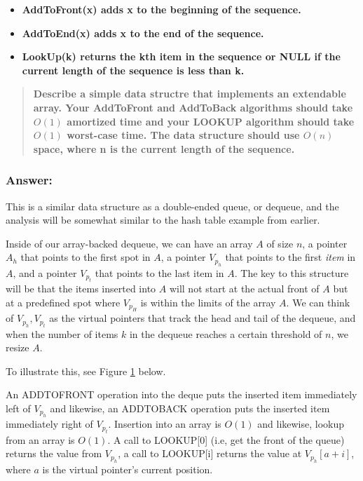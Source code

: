 \documentclass[titlepage]{article}\usepackage[]{graphicx}\usepackage[]{color}
\begin{document}
\begin{itemize}
  \item \textbf{AddToFront(x) adds x to the beginning of the sequence.}
  \item \textbf{AddToEnd(x) adds x to the end of the sequence.}
  \item \textbf{LookUp(k) returns the kth item in the sequence or NULL if the
	current length of the sequence is less than k. }
\end{itemize}
\begin{quote}
  \textbf{Describe a simple data structre that implements an extendable array.
	Your AddToFront and AddToBack algorithms should take $O(1)$ amortized time
	and your LOOKUP algorithm should take $O(1)$ worst-case time. The data
	structure should use $O(n)$ space, where n is the current length of the
  sequence.}
\end{quote}

\subsubsection{Answer:}
This is a similar data structure as a double-ended queue, or dequeue, and the
analysis will be somewhat similar to the hash table example from earlier. 

Inside of our array-backed dequeue, we can have an array $A$ of size $n$, a pointer
$A_h$ that points to the first spot in $A$, a pointer $V_{p_h}$ that points to
the first \textit{item} in $A$, and a pointer $V_{p_t}$ that points to the last
item in $A$. The key to this structure will be that the items inserted into $A$
will not start at the actual front of $A$ but at a predefined spot where
$V_{p_H}$ is within the limits of the array $A$. We can think of $V_{p_h},
V_{p_t}$ as the virtual pointers that track the head and tail of the dequeue,
and when the number of items $k$ in the dequeue reaches a certain threshold of
$n$, we resize $A$. 

To illustrate this, see Figure \ref{fig:deque} below.

\begin{figure}
	\label{fig:deque}

\end{figure}
An ADDTOFRONT operation into the deque puts the inserted item immediately left of
$V_{p_h}$ and likewise, an ADDTOBACK operation puts the inserted item
immediately right of $V_{p_t}$. Insertion into an array is $O(1)$ and likewise,
lookup from an array is $O(1)$. A call to LOOKUP[0] (i.e, get the front of the
queue) returns the value from $V_{p_h}$, a call to LOOKUP[i] returns the value
at $V_{p_h}[a+i]$, where $a$ is the virtual pointer's current position.
\end{document}
